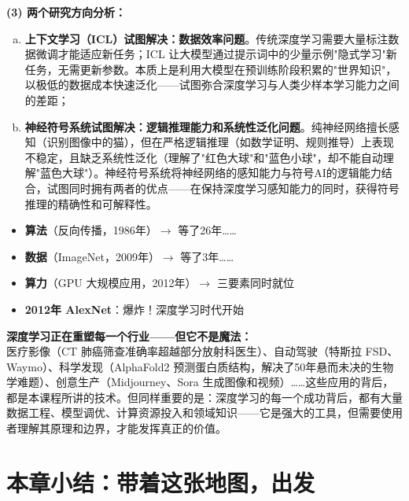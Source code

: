 \documentclass[a4paper,11pt]{ctexart}
\begin{document}
\begin{solutionbox}[参考答案与详细解析]
    \textbf{(3) 两个研究方向分析：}

    \begin{enumerate}[a.]
        \item \textbf{上下文学习（ICL）试图解决：数据效率问题}。传统深度学习需要大量标注数据微调才能适应新任务；ICL 让大模型通过提示词中的少量示例"隐式学习"新任务，无需更新参数。本质上是利用大模型在预训练阶段积累的"世界知识"，以极低的数据成本快速泛化——试图弥合深度学习与人类少样本学习能力之间的差距；

        \item \textbf{神经符号系统试图解决：逻辑推理能力和系统性泛化问题}。纯神经网络擅长感知（识别图像中的猫），但在严格逻辑推理（如数学证明、规则推导）上表现不稳定，且缺乏系统性泛化（理解了"红色大球"和"蓝色小球"，却不能自动理解"蓝色大球"）。神经符号系统将神经网络的感知能力与符号AI的逻辑能力结合，试图同时拥有两者的优点——在保持深度学习感知能力的同时，获得符号推理的精确性和可解释性。
    \end{enumerate}

    \begin{keybox}[深度学习三要素的历史时间线]
        \begin{itemize}
            \item \textbf{算法}（反向传播，1986年）$\to$ 等了26年……
            \item \textbf{数据}（ImageNet，2009年）$\to$ 等了3年……
            \item \textbf{算力}（GPU 大规模应用，2012年）$\to$ 三要素同时就位
            \item \textbf{2012年 AlexNet}：爆炸！深度学习时代开始
        \end{itemize}
    \end{keybox}
\end{solutionbox}

\begin{appbox}[现实应用场景]
    \textbf{深度学习正在重塑每一个行业——但它不是魔法：}\\
    医疗影像（CT 肺癌筛查准确率超越部分放射科医生）、自动驾驶（特斯拉 FSD、Waymo）、科学发现（AlphaFold2 预测蛋白质结构，解决了50年悬而未决的生物学难题）、创意生产（Midjourney、Sora 生成图像和视频）……这些应用的背后，都是本课程所讲的技术。但同样重要的是：深度学习的每一个成功背后，都有大量数据工程、模型调优、计算资源投入和领域知识——它是强大的工具，但需要使用者理解其原理和边界，才能发挥真正的价值。
\end{appbox}

\section{本章小结：带着这张地图，出发}
\end{document}
